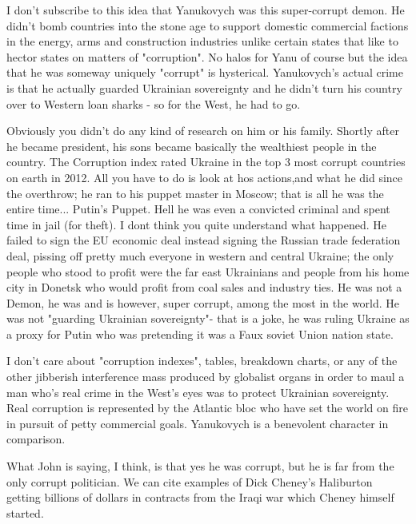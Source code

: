 \begin{itemize}
I don't subscribe to this idea that Yanukovych was this super-corrupt demon. He
didn't bomb countries into the stone age to support domestic commercial
factions in the energy, arms and construction industries unlike certain states
that like to hector states on matters of "corruption". No halos for Yanu of
course but the idea that he was someway uniquely "corrupt" is hysterical.
Yanukovych's actual crime is that he actually guarded Ukrainian sovereignty and
he didn't turn his country over to Western loan sharks - so for the West, he
had to go.

\begin{itemize} %

Obviously you didn't do any kind of research on him or his family. Shortly
after he became president, his sons became basically the wealthiest people in
the country. The Corruption index rated Ukraine in the top 3 most corrupt
countries on earth in 2012. All you have to do is look at hos actions,and what
he did since the overthrow; he ran to his puppet master in Moscow; that is all
he was the entire time... Putin's Puppet. Hell he was even a convicted criminal
and spent time in jail (for theft). I dont think you quite understand what
happened. He failed to sign the EU economic deal instead signing the Russian
trade federation deal, pissing off pretty much everyone in western and central
Ukraine; the only people who stood to profit were the far east Ukrainians and
people from his home city in Donetsk who would profit from coal sales and
industry ties. He was not a Demon, he was and is however, super corrupt, among
the most in the world. He was not "guarding Ukrainian sovereignty"- that is a
joke, he was ruling Ukraine as a proxy for Putin who was pretending it was a
Faux soviet Union nation state.


I don't care about "corruption indexes", tables, breakdown charts, or any of
the other jibberish interference mass produced by globalist organs in order to
maul a man who's real crime in the West's eyes was to protect Ukrainian
sovereignty. Real corruption is represented by the Atlantic bloc who have set
the world on fire in pursuit of petty commercial goals. Yanukovych is a
benevolent character in comparison.


What John is saying, I think, is that yes he was corrupt, but he is far from
the only corrupt politician. We can cite examples of Dick Cheney's Haliburton
getting billions of dollars in contracts from the Iraqi war which Cheney
himself started.


\end{itemize}
\end{itemize}
